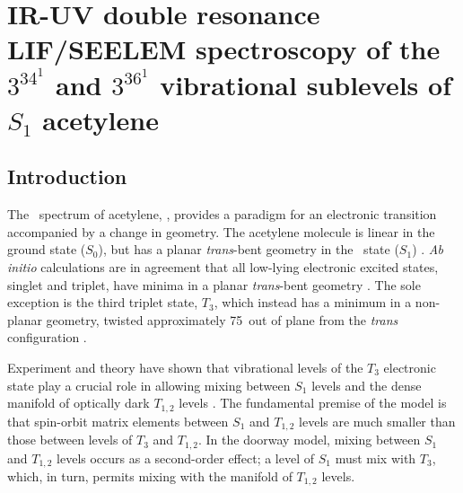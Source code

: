 % 




\chapter{  IR-UV double resonance LIF/SEELEM spectroscopy of the
  $3^34^1$  and $3^36^1$  vibrational sublevels of $S_1$
  acetylene}

\section{Introduction}

The \AtoX\ spectrum of acetylene, , provides a paradigm for
an electronic transition accompanied by a change in geometry.  The
acetylene molecule is linear in the ground state ($S_0$), but has a
planar \emph{trans}-bent geometry in the \astate\ state ($S_1$)
\cite{king52, ingold53, innes54}.  \emph{Ab initio} calculations are
in agreement that all low-lying electronic excited states, singlet and
triplet, have minima in a planar \emph{trans}-bent geometry
\cite{demoulin75, lischka86, yamaguchi93, sherrill96, malsch98,
  ventura03}.  The sole exception is the third triplet state, $T_3$,
which instead has a minimum in a non-planar geometry, twisted
approximately 75\degrees\ out of plane from the \emph{trans}
configuration \cite{cui96, ventura03, thom07}.

Experiment and theory have shown that vibrational levels of the $T_3$
electronic state play a crucial role in allowing mixing between $S_1$
levels and the dense manifold of optically dark $T_{1,2}$ levels
\cite{humphrey97, altunata00, dupre93, cui97, thom07, ventura03}.  The
fundamental premise of the model is that spin-orbit matrix elements
between $S_1$ and $T_{1,2}$ levels are much smaller than those between
levels of $T_3$ and $T_{1,2}$.  In the doorway model, mixing between
$S_1$ and $T_{1,2}$ levels occurs as a second-order effect; a level
of $S_1$ must mix with $T_3$, which, in turn, permits mixing with the
manifold of $T_{1,2}$ levels.

